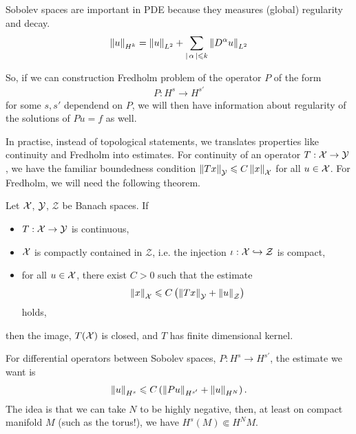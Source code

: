 \documentclass{article}
\begin{document}
Sobolev spaces are important in PDE because they measures (global) regularity and decay. 
\begin{align*}
\norm[u]_{H^k} = \norm[u]_{L^2} + \sum_{\abs{\alpha} \leq k} \norm[D^\alpha u ]_{L^2} 
\end{align*}

So, if we can construction Fredholm problem of the operator $P$ of the form
\begin{align*}
P : H^{s} \to H^{s'}
\end{align*}
for some $s, s'$ dependend on $P$, we will then have information about regularity of the solutions of $Pu = f$ as well. 


In practise, instead of topological statements, we translates properties like continuity and Fredholm into estimates. For continuity of an operator $T : \X \to \Y$, we have the familiar boundedness condition $\norm[Tx]_{\Y} \leq C \norm[x]_{\X}$ for all $u \in \X$. For Fredholm, we will need the following theorem. 
\begin{theorem} \label{theorem: fredholm estimates}
    Let $\X$, $\Y$, $\mathcal{Z}$ be Banach spaces.  If 
    \begin{itemize}
        \item $T : \X \to \Y$ is continuous, 
        \item $\X$ is compactly contained in $\mathcal{Z}$, i.e. the injection $\iota : \X\hookrightarrow \mathcal{Z}$ is compact, 
        \item for all $u \in \X$, there exist $C > 0$ such that the estimate 
        \begin{align*}
        \norm[x]_\X \leq C \brac{\norm[Tx]_\Y + \norm[u]_\mathcal{Z}}
        \end{align*}
        holds, 
    \end{itemize}
     then the image, $T(\X)$ is closed, and $T$ has finite dimensional kernel. 
\end{theorem}

For differential operators between Sobolev spaces, $P : H^s \to H^{s'}$,  the estimate we want is 
\begin{align*}
\norm[u]_{H^s} \leq C \brac{\norm[Pu]_{H^{s'}} + \norm[u]_{H^{N}}}. 
\end{align*}
The idea is that we can take $N$ to be highly negative, then, at least on compact manifold $M$ (such as the torus!), we have $H^s(M) \Subset H^N{M}$. 
\end{document}
